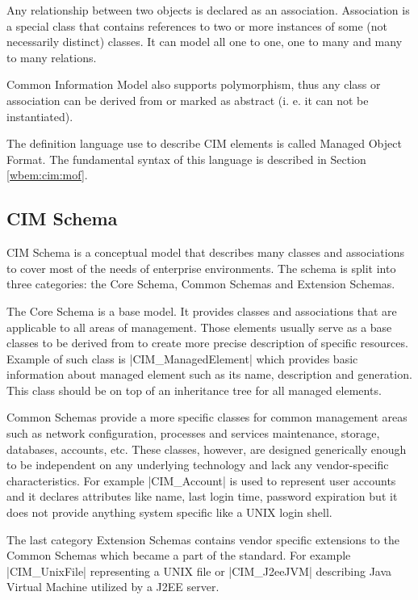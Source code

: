 Any relationship between two objects is declared as an association. Association
is a special class that contains references to two or more instances of some
(not necessarily distinct) classes. It can model all one to one, one to many and
many to many relations.

Common Information Model also supports polymorphism, thus any class or
association can be derived from or marked as abstract (i. e. it can not be
instantiated).

The definition language use to describe CIM elements is called Managed Object
Format. The fundamental syntax of this language is described in Section
\ref{wbem:cim:mof}.

\subsection{CIM Schema}
\label{wbem:cim:schema}

CIM Schema is a conceptual model that describes many classes and associations to
cover most of the needs of enterprise environments. The schema is split into
three categories: the Core Schema, Common Schemas and Extension Schemas.

The Core Schema is a base model. It provides classes and associations that are
applicable to all areas of management. Those elements usually serve as a base
classes to be derived from to create more precise description of specific
resources. Example of such class is |CIM_ManagedElement| which provides basic
information about managed element such as its name, description and generation.
This class should be on top of an inheritance tree for all managed elements.

Common Schemas provide a more specific classes for common management areas such
as network configuration, processes and services maintenance, storage,
databases, accounts, etc. These classes, however, are designed generically
enough to be independent on any underlying technology and lack any
vendor-specific characteristics. For example |CIM_Account| is used to represent
user accounts and it declares attributes like name, last login time, password
expiration but it does not provide anything system specific like a UNIX login
shell.

The last category Extension Schemas contains vendor specific extensions to the
Common Schemas which became a part of the standard. For example |CIM_UnixFile|
representing a UNIX file or |CIM_J2eeJVM| describing Java Virtual Machine
utilized by a J2EE server.

